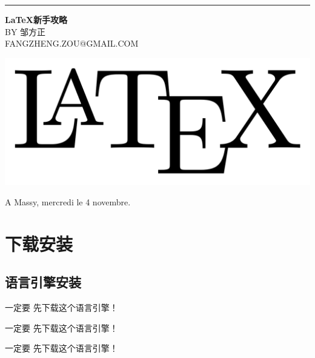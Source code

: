 \documentclass[12pt,a4paper,oneside]{book}
\newcommand{\yihao}{\fontsize{26pt}{\baselineskip}\selectfont}%
\newcommand{\sihao}{\fontsize{14pt}{\baselineskip}\selectfont}%
\newcommand{\drop}{ 0.08\textheight}
\begin{document}
 \sihao
\begin{minipage}{0.2\textwidth}
%
\hspace*{0.2\textwidth}\textcolor[RGB]{16,136,136}{\rule{6pt}{\textheight}}
\end{minipage}
\hfill
\begin{minipage}{0.8\textwidth}

\thispagestyle{empty}
\par
\par

\vspace*{0.2\textwidth}
\hspace*{0.3\textwidth}
{\bfseries \yihao \bkmo\textcolor[RGB]{181,72,61}{\LaTeX 新手攻略}}\\[\drop]
\vspace*{0.02\textwidth}
\hspace*{0.6\textwidth}
BY {\sihao\bkmo 邹方正}\\
\vspace*{0.02\textwidth}
\hspace*{0.3\textwidth}
{\small \deja \textcolor[RGB]{20,144,188}{FANGZHENG.ZOU@GMAIL.COM}}\\
\vfill
\begin{center}
\includegraphics[scale=0.15]{latex.png}
\end{center}
\vspace*{0.1\textwidth}
\begin{center}
A Massy, mercredi le 4 novembre.
\end{center}
\end{minipage}
\restoregeometry
\setcounter{page}{1}
\tableofcontents

\newpage
\setcounter{page}{1}
\chapter{下载安装}



\section{语言引擎安装}
一定要 \textcolor[RGB]{255,0,51} {先下载}这个语言引擎！
\par
一定要 \textcolor[RGB]{255,0,51} {先下载}这个语言引擎！
\par
一定要 \textcolor[RGB]{255,0,51} {先下载}这个语言引擎！
\par
\end{document}
